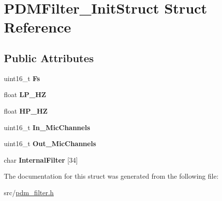 \hypertarget{struct_p_d_m_filter___init_struct}{}\section{P\+D\+M\+Filter\+\_\+\+Init\+Struct Struct Reference}
\label{struct_p_d_m_filter___init_struct}
\subsection*{Public Attributes}
\begin{DoxyCompactItemize}
\item 
\mbox{\label{struct_p_d_m_filter___init_struct_aab12d558180c4fd3be25fc538b9b4b10}} 
uint16\+\_\+t {\bfseries Fs}
\item 
\mbox{\label{struct_p_d_m_filter___init_struct_a4b4c022414b7cc762aa24d041d829359}} 
float {\bfseries L\+P\+\_\+\+HZ}
\item 
\mbox{\label{struct_p_d_m_filter___init_struct_ac36905754b6a43ff586fa1fef12e4c16}} 
float {\bfseries H\+P\+\_\+\+HZ}
\item 
\mbox{\label{struct_p_d_m_filter___init_struct_a7d30f10b18e345c4c5141727c3491788}} 
uint16\+\_\+t {\bfseries In\+\_\+\+Mic\+Channels}
\item 
\mbox{\label{struct_p_d_m_filter___init_struct_aa4e8e824f601a2ff15a5fa367b6477ab}} 
uint16\+\_\+t {\bfseries Out\+\_\+\+Mic\+Channels}
\item 
\mbox{\label{struct_p_d_m_filter___init_struct_ab2c7294dda7551e298c46289c9f2a5b4}} 
char {\bfseries Internal\+Filter} \mbox{[}34\mbox{]}
\end{DoxyCompactItemize}


The documentation for this struct was generated from the following file\+:\begin{DoxyCompactItemize}
\item 
src/\mbox{\hyperlink{pdm__filter_8h}{pdm\+\_\+filter.\+h}}\end{DoxyCompactItemize}
